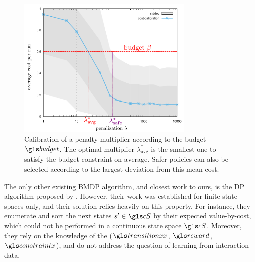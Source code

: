 \begin{figure}[tp]
    \centering
    \includegraphics[width=0.75\textwidth]{sources/contribution/nips/source/img/CalibrationExample}
    \caption[Calibration for Lagragian Relaxation.]{Calibration of a penalty multiplier according to the budget $\budget$. The optimal multiplier $\lambda^*_{\text{avg}}$ is the smallest one to satisfy the budget constraint on average. Safer policies can also be selected according to the largest deviation from this mean cost.}
    \label{fig:Lagrangian}
\end{figure}


The only other existing \gls{BMDP} algorithm, and closest work to ours, is the \gls{DP} algorithm proposed by \textcite{Boutilier_Lu:uai16}. However, their work was established for finite state spaces only, and their solution relies heavily on this property. For instance, they enumerate and sort the next states $s'\in\cS$ by their expected value-by-cost, which could not be performed in a continuous state space $\cS$. Moreover, they rely on the knowledge of the  ($\transition$, $\reward$, $\constraint$), and do not address the question of learning from interaction data.

